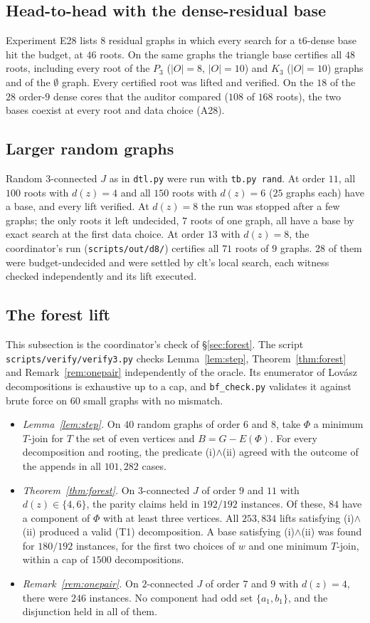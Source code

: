 \documentclass[11pt]{amsart}
\theoremstyle{definition}
\newcommand{\HEADTOHEAD}{all}
\newcommand{\RANDOMTB}{Random $3$-connected $J$ as in \texttt{dtl.py} were run with \texttt{tb.py rand}. At order $11$, all $100$ roots with $d(z)=4$ and all $150$ roots with $d(z)=6$ ($25$ graphs each) have a base, and every lift verified. At $d(z)=8$ the run was stopped after a few graphs; the only roots it left undecided, $7$ roots of one graph, all have a base by exact search at the first data choice. At order $13$ with $d(z)=8$, the coordinator's run (\texttt{scripts/out/d8/}) certifies all $71$ roots of $9$ graphs. $28$ of them were budget-undecided and were settled by clt's local search, each witness checked independently and its lift executed.}
\begin{document}
\subsection{Head-to-head with the dense-residual base}
Experiment E28 lists $8$ residual graphs in which every search for a t6-dense base hit the budget, at
$46$ roots. On the same graphs the triangle base certifies \HEADTOHEAD{} $48$ roots, including
every root of the $P_3$ ($|O|=8$, $|O|=10$) and $K_3$ ($|O|=10$) graphs and of the $\emptyset$ graph.
Every certified root was lifted and verified. On the $18$ of the $28$ order-$9$ dense cores that the
auditor compared ($108$ of $168$ roots), the two bases coexist at every root and data choice (A28).

\subsection{Larger random graphs}
\RANDOMTB

\subsection{The forest lift}
This subsection is the coordinator's check of \S\ref{sec:forest}. The script \texttt{scripts/verify/verify3.py} checks Lemma~\ref{lem:step},
Theorem~\ref{thm:forest} and Remark~\ref{rem:onepair} independently of the oracle. Its enumerator of
Lov\'asz decompositions is exhaustive up to a cap, and \texttt{bf\_check.py} validates it against brute
force on $60$ small graphs with no mismatch.
\begin{itemize}[leftmargin=*]
\item \emph{Lemma~\ref{lem:step}.} On $40$ random graphs of order $6$ and $8$, take $\Phi$ a minimum
$T$-join for $T$ the set of even vertices and $B=G-E(\Phi)$. For every decomposition and rooting, the
predicate (i)$\wedge$(ii) agreed with the outcome of the appends in all $101{,}282$ cases.
\item \emph{Theorem~\ref{thm:forest}.} On $3$-connected $J$ of order $9$ and $11$ with $d(z)\in\{4,6\}$,
the parity claims held in $192/192$ instances. Of these, $84$ have a component of $\Phi$ with at least
three vertices. All $253{,}834$ lifts satisfying (i)$\wedge$(ii) produced a valid (T1) decomposition.
A base satisfying (i)$\wedge$(ii) was found for $180/192$ instances, for the first two choices of $w$
and one minimum $T$-join, within a cap of $1500$ decompositions.
\item \emph{Remark~\ref{rem:onepair}.} On $2$-connected $J$ of order $7$ and $9$ with $d(z)=4$, there were
$246$ instances. No component had odd set $\{a_1,b_1\}$, and the disjunction held in all of them.
\end{itemize}
\end{document}
